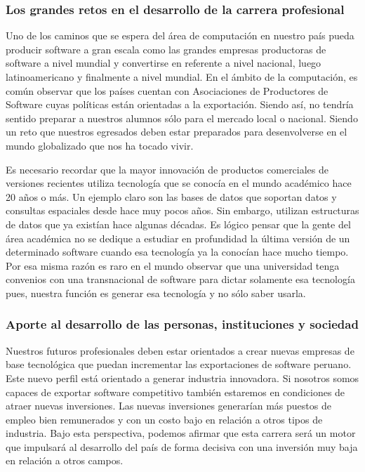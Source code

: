 \subsubsection{Los grandes retos en el desarrollo de la carrera profesional}
Uno de los caminos que se espera del área de computación en nuestro país pueda producir software a gran escala como las 
grandes empresas productoras de software a nivel mundial y convertirse en referente a nivel nacional, luego latinoamericano y 
finalmente a nivel mundial. En el ámbito de la computación, es común observar que los países cuentan con
Asociaciones de Productores de Software cuyas políticas están orientadas a la exportación. Siendo así, 
no tendría sentido preparar a nuestros alumnos sólo para el mercado local o nacional. 
Siendo un reto que nuestros egresados deben estar preparados para desenvolverse en el mundo globalizado que nos ha tocado vivir.

Es necesario recordar que la mayor innovación de productos comerciales de versiones recientes utiliza tecnología que se conocía 
en el mundo académico hace 20 años o más. Un ejemplo claro son las bases de datos que soportan datos y consultas espaciales 
desde hace muy pocos años. Sin embargo, utilizan estructuras de datos que ya existían hace algunas décadas. 
Es lógico pensar que la gente del área académica no se dedique a estudiar en profundidad la última versión de un 
determinado software cuando esa tecnología ya la conocían hace mucho tiempo. Por esa misma razón es raro en el 
mundo observar que una universidad tenga convenios con una transnacional de software para dictar solamente esa 
tecnología pues, nuestra función es generar esa tecnología y no sólo saber usarla.

\subsubsection{Aporte al desarrollo de las personas, instituciones y sociedad}
Nuestros futuros profesionales deben estar orientados a crear nuevas empresas de base tecnológica que puedan 
incrementar las exportaciones de software peruano. Este nuevo perfil está orientado a generar industria innovadora. 
Si nosotros somos capaces de exportar software competitivo también estaremos en condiciones de atraer nuevas inversiones. 
Las nuevas inversiones generarían más puestos de empleo bien remunerados y con un costo bajo en relación a otros tipos de industria. 
Bajo esta perspectiva, podemos afirmar que esta carrera será un motor que impulsará al desarrollo del país de forma decisiva 
con una inversión muy baja en relación a otros campos.

